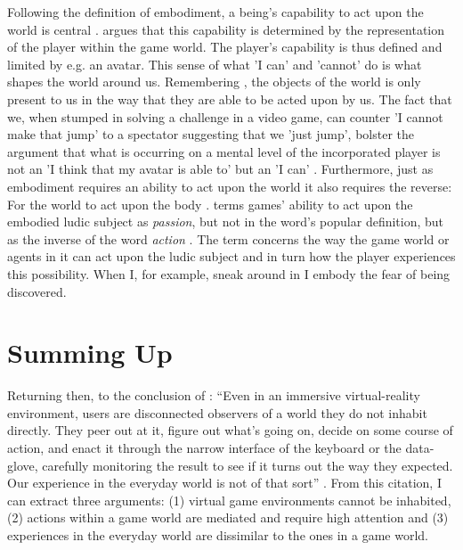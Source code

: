 Following the definition of embodiment, a being's capability to act upon the world is central \cite{ponty}.  argues that this capability is determined by the representation of the player within the game world. The player's capability is thus defined and limited by e.g. an avatar. This sense of what 'I can' and 'cannot' do is what shapes the world around us. Remembering , the objects of the world is only present to us in the way that they are able to be acted upon by us. The fact that we, when stumped in solving a challenge in a video game, can counter 'I cannot make that jump' to a spectator suggesting that we 'just jump', bolster the argument that what is occurring on a mental level of the incorporated player is not an 'I think that my avatar is able to' but an 'I can' \cite{vellashort}. Furthermore, just as embodiment requires an ability to act upon the world it also requires the reverse: For the world to act upon the body \cite{ponty}.  terms games' ability to act upon the embodied ludic subject as \textit{passion}, but not in the word's popular definition, but as the inverse of the word \textit{action} \cite{vella}. The term concerns the way the game world or agents in it can act upon the ludic subject and in turn how the player experiences this possibility. When I, for example, sneak around in  I embody the fear of being discovered.

\section*{Summing Up}
Returning then, to the conclusion of : ``Even in an immersive virtual-reality environment, users are disconnected observers of a world they do not inhabit directly. They peer out at it, figure out what’s going on, decide on some course of action, and enact it through the narrow interface of the keyboard or the data-glove, carefully monitoring the result to see if it turns out the way they expected. Our experience in the everyday world is not of that sort'' \cite[p. 102]{dourish}. From this citation, I can extract three arguments: (1) virtual game environments cannot be inhabited, (2) actions within a game world are mediated and require high attention and (3) experiences in the everyday world are dissimilar to the ones in a game world.

